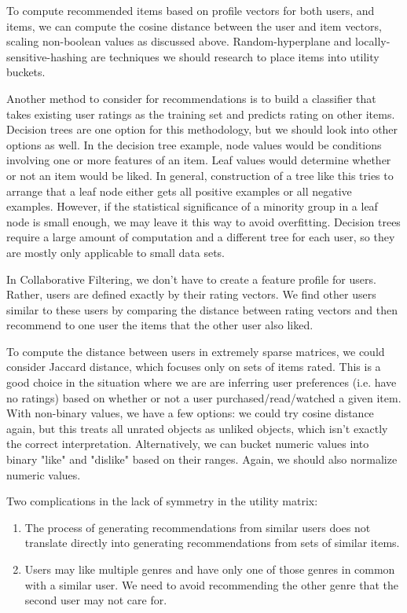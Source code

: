 \documentclass[11pt]{article}
\begin{document}
\par To compute recommended items based on profile vectors for both users, and items, we can compute the cosine distance between the user and item vectors, scaling non-boolean values as discussed above. Random-hyperplane and locally-sensitive-hashing are techniques we should research to place items into utility buckets. \\
\par Another method to consider for recommendations is to build a classifier that takes existing user ratings as the training set and predicts rating on other items. Decision trees are one option for this methodology, but we should look into other options as well. In the decision tree example, node values would be conditions involving one or more features of an item. Leaf values would determine whether or not an item would be liked. In general, construction of a tree like this tries to arrange that a leaf node either gets all positive examples or all negative examples. However, if the statistical significance of a minority group in a leaf node is small enough, we may leave it this way to avoid overfitting. Decision trees require a large amount of computation and a different tree for each user, so they are mostly only applicable to small data sets.\\
\par In Collaborative Filtering, we don't have to create a feature profile for users. Rather, users are defined exactly by their rating vectors. We find other users similar to these users by comparing the distance between rating vectors and then recommend to one user the items that the other user also liked. \\
\par To compute the distance between users in extremely sparse matrices, we could consider Jaccard distance, which focuses only on sets of items rated. This is a good choice in the situation where we are are inferring user preferences (i.e. have no ratings) based on whether or not a user purchased/read/watched a given item. With non-binary values, we have a few options: we could try cosine distance again, but this treats all unrated objects as unliked objects, which isn't exactly the correct interpretation. Alternatively, we can bucket numeric values into binary "like" and "dislike" based on their ranges. Again, we should also normalize numeric values. \\
\par Two complications in the lack of symmetry in the utility matrix: 
\begin{enumerate}
		\item The process of generating recommendations from similar users does not translate directly into generating recommendations from sets of similar items.
		\item Users may like multiple genres and have only one of those genres in common with a similar user. We need to avoid recommending the other genre that the second user may not care for.
\end{enumerate}		
\end{document}
